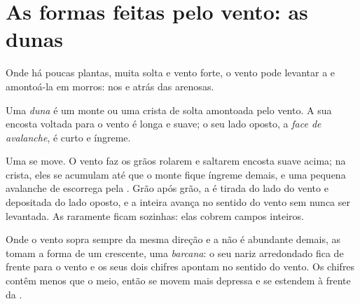 \section{As formas feitas pelo vento: as dunas}

Onde há poucas plantas, muita  solta e vento forte, o vento pode
levantar a  e amontoá-la em morros: nos  e atrás das 
arenosas.

\begin{definition}[Duna]\label{def:g9:landforms:dune}
Uma \emph{duna} é um monte ou uma crista de  solta
amontoada pelo vento. A sua encosta voltada para o vento é longa e suave;
o seu lado oposto, a \emph{face de avalanche},
é curto e íngreme.
\end{definition}

Uma  se move. O vento faz os grãos rolarem e saltarem encosta suave
acima; na crista, eles se acumulam até que o monte fique íngreme demais, e
uma pequena avalanche de  escorrega pela . Grão após
grão, a  é tirada do lado do vento e depositada do lado oposto, e a
 inteira avança no sentido do vento sem nunca ser levantada. As 
raramente ficam sozinhas: elas cobrem campos inteiros.

Onde o vento sopra sempre da mesma direção e a  não é abundante
demais, as  tomam a forma de um crescente, uma \emph{barcana}: o seu
nariz arredondado fica de frente para o vento e os seus dois chifres
apontam no sentido do vento. Os chifres contêm menos  que o meio,
então se movem mais depressa e se estendem à frente da .

